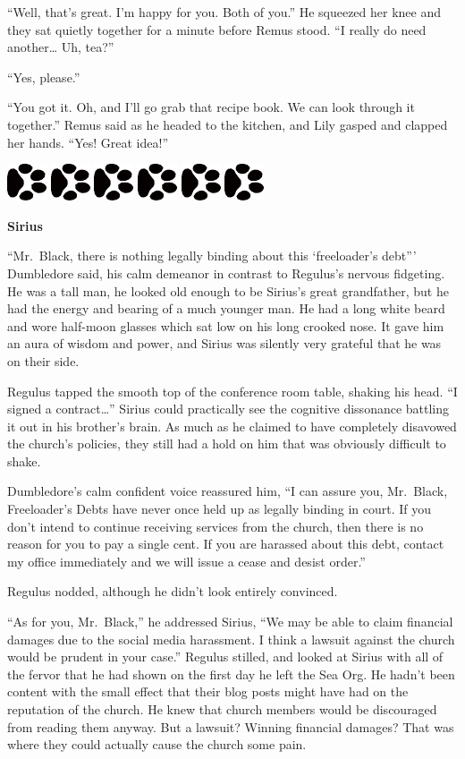 \documentclass[12pt,twoside,openright]{memoir}
\newcommand{\dogPrintRule}{	
	\begin{center}
		\hspace{.5em}
		\includegraphics[angle=60]{dogprint.pdf}
		\hspace{.5em}
		\includegraphics[angle=120]{dogprint.pdf}
		\hspace{.5em}
		\includegraphics[angle=60]{dogprint.pdf}
		\hspace{.5em}
		\includegraphics[angle=120]{dogprint.pdf}
		\hspace{.5em}
		\includegraphics[angle=60]{dogprint.pdf}
		\hspace{.5em}
		\includegraphics[angle=120]{dogprint.pdf}
		\hspace{.5em}
	\end{center}
}
\begin{document}
``Well, that's great. I'm happy for you. Both of you.'' He squeezed her knee and they sat quietly together for a minute before Remus stood. ``I really do need another… Uh, tea?''

``Yes, please.'' 

``You got it. Oh, and I'll go grab that recipe book. We can look through it together.'' Remus said as he headed to the kitchen, and Lily gasped and clapped her hands. ``Yes! Great idea!''

\dogPrintRule

\textbf{Sirius} 

``Mr.\ Black, there is nothing legally binding about this ‘freeloader's debt''' Dumbledore said, his calm demeanor in contrast to Regulus's nervous fidgeting. He was a tall man, he looked old enough to be Sirius's great grandfather, but he had the energy and bearing of a much younger man. He had a long white beard and wore half-moon glasses which sat low on his long crooked nose. It gave him an aura of wisdom and power, and Sirius was silently very grateful that he was on their side.

Regulus tapped the smooth top of the conference room table, shaking his head. ``I signed a contract…'' Sirius could practically see the cognitive dissonance battling it out in his brother's brain. As much as he claimed to have completely disavowed the church's policies, they still had a hold on him that was obviously difficult to shake. 

Dumbledore's calm confident voice reassured him, ``I can assure you, Mr.\ Black, Freeloader's Debts have never once held up as legally binding in court. If you don't intend to continue receiving services from the church, then there is no reason for you to pay a single cent. If you are harassed about this debt, contact my office immediately and we will issue a cease and desist order.''

Regulus nodded, although he didn't look entirely convinced.

``As for you, Mr.\ Black,'' he addressed Sirius, ``We may be able to claim financial damages due to the social media harassment. I think a lawsuit against the church would be prudent in your case.'' Regulus stilled, and looked at Sirius with all of the fervor that he had shown on the first day he left the Sea Org. He hadn't been content with the small effect that their blog posts might have had on the reputation of the church. He knew that church members would be discouraged from reading them anyway. But a lawsuit? Winning financial damages? That was where they could actually cause the church some pain. 
\end{document}
